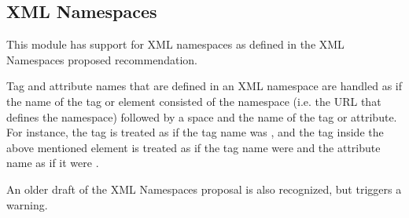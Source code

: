 \subsection{XML Namespaces \label{xml-namespace}}

This module has support for XML namespaces as defined in the XML
Namespaces proposed recommendation.

Tag and attribute names that are defined in an XML namespace are
handled as if the name of the tag or element consisted of the
namespace (i.e. the URL that defines the namespace) followed by a
space and the name of the tag or attribute.  For instance, the tag
 is treated as if 
the tag name was , and
the tag  inside the above
mentioned element is treated as if the tag name were
 and the attribute name as
if it were .

An older draft of the XML Namespaces proposal is also recognized, but
triggers a warning.
